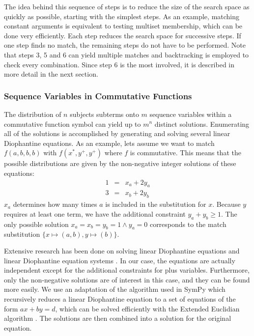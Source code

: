 \documentclass[conference,compsoc]{IEEEtran}
\newcommand{\plusvar}[1]{{#1}^+}
\newcommand{\starvar}[1]{{#1}^*}
\begin{document}
The idea behind this sequence of steps is to reduce the size of the search space as quickly as possible, starting with the simplest steps. As an example, matching constant arguments is equivalent to testing multiset membership, which can be done very efficiently. Each step reduces the search space for successive steps. If one step finds no match, the remaining steps do not have to be performed.
Note that steps 3, 5 and 6 can yield multiple matches and backtracking is employed to check every combination.
Since step 6 is the most involved, it is described in more detail in the next section.

\subsubsection{Sequence Variables in Commutative Functions%
  \label{sequence-variables-in-commutative-functions}%
}


The distribution of $n$ subjects subterms onto $m$ sequence variables within a
commutative function symbol can yield up to $m^n$ distinct solutions.
Enumerating all of the solutions is accomplished by generating and solving several linear Diophantine equations.
As an example, lets assume we want to match $f(a, b, b, b)$ with $f(\starvar{x}, \plusvar{y}, \plusvar{y})$ where $f$ is commutative.
This means that the possible distributions are given by the non-negative integer solutions of these equations:
\begin{eqnarray*}
1 &=& x_a + 2 y_a \\
3 &=& x_b + 2 y_b
\end{eqnarray*}
$x_a$ determines how many times $a$ is included in the substitution for $x$.
Because $y$ requires at least one term, we have the additional constraint $y_a + y_b \geq 1$.
The only possible solution $x_a = x_b = y_b = 1 \wedge y_a = 0$ corresponds to the match substitution $\{ x \mapsto (a, b), y \mapsto (b) \}$.

Extensive research has been done on solving linear Diophantine equations and linear Diophantine
equation systems \cite{Weinstock1960,Bond1967,Lambert1988,Clausen1989,Aardal2000}.
In our case, the equations are actually independent except for the additional constraints for plus variables.
Furthermore, only the non-negative solutions are of interest in this case, and they can be found more easily.
We use an adaptation of the algorithm used in SymPy which recursively reduces
a linear Diophantine equation to a set of equations of the form $ax + by = d$, which can be solved efficiently with the Extended Euclidian algorithm \cite{Menezes1996}.
The solutions are then combined into a solution for the original equation.
\end{document}
